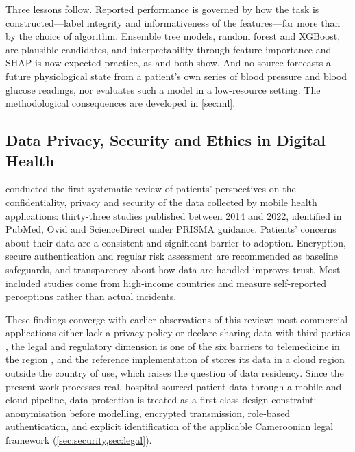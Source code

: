 Three lessons follow. Reported performance is governed by how the task is constructed---label integrity and informativeness of the features---far more than by the choice of algorithm. Ensemble tree models, random forest and XGBoost, are plausible candidates, and interpretability through feature importance and SHAP is now expected practice, as \textcite{mendoza2025} and \textcite{liu2025ppg} both show. And no source forecasts a future physiological state from a patient's own series of blood pressure and blood glucose readings, nor evaluates such a model in a low-resource setting. The methodological consequences are developed in \cref{sec:ml}.

\subsection{Data Privacy, Security and Ethics in Digital Health}\label{sec:lr-privacy}

\Textcite{alhammad2024} conducted the first systematic review of patients' perspectives on the confidentiality, privacy and security of the data collected by mobile health applications: thirty-three studies published between 2014 and 2022, identified in PubMed, Ovid and ScienceDirect under PRISMA guidance. Patients' concerns about their data are a consistent and significant barrier to adoption. Encryption, secure authentication and regular risk assessment are recommended as baseline safeguards, and transparency about how data are handled improves trust. Most included studies come from high-income countries and measure self-reported perceptions rather than actual incidents.

These findings converge with earlier observations of this review: most commercial applications either lack a privacy policy or declare sharing data with third parties \parencite{alessa2019}, the legal and regulatory dimension is one of the six barriers to telemedicine in the region \parencite{dodoo2022}, and the reference implementation of \textcite{efendi2025} stores its data in a cloud region outside the country of use, which raises the question of data residency. Since the present work processes real, hospital-sourced patient data through a mobile and cloud pipeline, data protection is treated as a first-class design constraint: anonymisation before modelling, encrypted transmission, role-based authentication, and explicit identification of the applicable Cameroonian legal framework (\cref{sec:security,sec:legal}).

